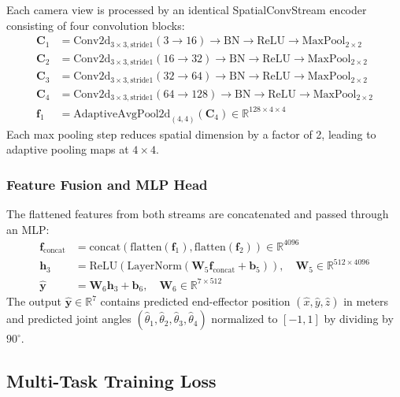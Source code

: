 \documentclass[12pt,a4paper,oneside]{report}
\begin{document}
Each camera view is processed by an identical SpatialConvStream encoder consisting of four convolution blocks:
\begin{align}
\mathbf{C}_1 &= \text{Conv2d}_{3\times3,\text{stride}1}(3 \rightarrow 16) \rightarrow \text{BN} \rightarrow \text{ReLU} \rightarrow \text{MaxPool}_{2\times2} \\
\mathbf{C}_2 &= \text{Conv2d}_{3\times3,\text{stride}1}(16 \rightarrow 32) \rightarrow \text{BN} \rightarrow \text{ReLU} \rightarrow \text{MaxPool}_{2\times2} \\
\mathbf{C}_3 &= \text{Conv2d}_{3\times3,\text{stride}1}(32 \rightarrow 64) \rightarrow \text{BN} \rightarrow \text{ReLU} \rightarrow \text{MaxPool}_{2\times2} \\
\mathbf{C}_4 &= \text{Conv2d}_{3\times3,\text{stride}1}(64 \rightarrow 128) \rightarrow \text{BN} \rightarrow \text{ReLU} \rightarrow \text{MaxPool}_{2\times2} \\
\mathbf{f}_1 &= \text{AdaptiveAvgPool2d}_{(4,4)}(\mathbf{C}_4) \in \mathbb{R}^{128 \times 4 \times 4}
\end{align}
Each max pooling step reduces spatial dimension by a factor of 2, leading to adaptive pooling maps at $4 \times 4$.

\subsubsection{Feature Fusion and MLP Head}

The flattened features from both streams are concatenated and passed through an MLP:
\begin{align}
\mathbf{f}_{\text{concat}} &= \text{concat}(\text{flatten}(\mathbf{f}_1), \text{flatten}(\mathbf{f}_2)) \in \mathbb{R}^{4096} \\
\mathbf{h}_3 &= \text{ReLU}(\text{LayerNorm}(\mathbf{W}_5 \mathbf{f}_{\text{concat}} + \mathbf{b}_5)), \quad \mathbf{W}_5 \in \mathbb{R}^{512 \times 4096} \\
\hat{\mathbf{y}} &= \mathbf{W}_6 \mathbf{h}_3 + \mathbf{b}_6, \quad \mathbf{W}_6 \in \mathbb{R}^{7 \times 512}
\end{align}
The output $\hat{\mathbf{y}} \in \mathbb{R}^7$ contains predicted end-effector position $(\hat{x}, \hat{y}, \hat{z})$ in meters and predicted joint angles $(\hat{\theta}_1, \hat{\theta}_2, \hat{\theta}_3, \hat{\theta}_4)$ normalized to $[-1, 1]$ by dividing by $90^\circ$.

\subsection{Multi-Task Training Loss}
\end{document}
